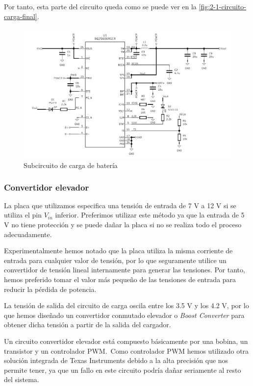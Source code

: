 Por tanto, esta parte del circuito queda como se puede ver en la \autoref{fig:2-1-circuito-carga-final}.

\begin{figure}[h]
    \centering
    \includegraphics[width=\textwidth]{images/2/2-1/circuitoCarga.png}
    \caption{Subcircuito de carga de batería}
    \label{fig:2-1-circuito-carga-final}
\end{figure}

\subsubsection{Convertidor elevador}\label{subsubsec:convertidor_elevador}

La placa que utilizamos especifica una tensión de entrada de 7 V a 12 V si se utiliza el pin $V_{in}$ inferior. Preferimos utilizar este método ya que la entrada de 5 V no tiene protección y se puede dañar la placa si no se realiza todo el proceso adecuadamente.

Experimentalmente hemos notado que la placa utiliza la misma corriente de entrada para cualquier valor de tensión, por lo que seguramente utilice un convertidor de tensión lineal internamente para generar las tensiones. Por tanto, hemos preferido tomar el valor más pequeño de las tensiones de entrada para reducir la pérdida de potencia.

La tensión de salida del circuito de carga oscila entre los 3.5 V y los 4.2 V, por lo que hemos diseñado un convertidor conmutado elevador o \textit{Boost Converter} para obtener dicha tensión a partir de la salida del cargador.

Un circuito convertidor elevador está compuesto básicamente por una bobina, un transistor y un controlador PWM.\ Como controlador PWM hemos utilizado otra solución integrada de Texas Instruments debido a la alta precisión que nos permite tener, ya que un fallo en este circuito podría dañar seriamente al resto del sistema. 

